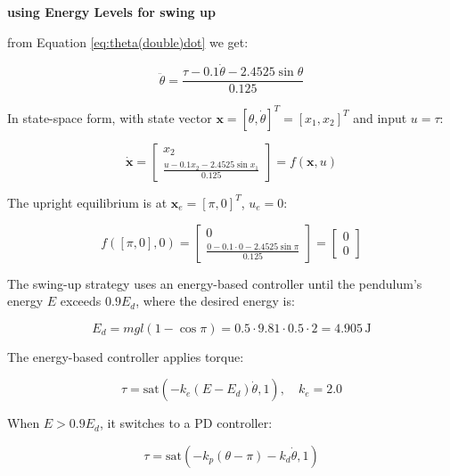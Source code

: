 \documentclass[12pt,a4paper]{article}
\begin{document}
\textbf{using Energy Levels for swing up}


from Equation \eqref{eq:theta(double)dot}
we get:

\begin{equation}\label{eq:theta(double)dot}
\ddot{\theta} = \frac{\tau - 0.1 \dot{\theta} - 2.4525 \sin \theta}{0.125}
\end{equation}

In state-space form, with state vector \( \mathbf{x} = [\theta, \dot{\theta}]^T = [x_1, x_2]^T \) and input \( u = \tau \):

\begin{equation}
\dot{\mathbf{x}} = \begin{bmatrix} x_2 \\ \frac{u - 0.1 x_2 - 2.4525 \sin x_1}{0.125} \end{bmatrix} = f(\mathbf{x}, u)
\end{equation}

The upright equilibrium is at \( \mathbf{x}_e = [\pi, 0]^T \), \( u_e = 0 \):

\begin{equation}
f([\pi, 0], 0) = \begin{bmatrix} 0 \\ \frac{0 - 0.1 \cdot 0 - 2.4525 \sin \pi}{0.125} \end{bmatrix} = \begin{bmatrix} 0 \\ 0 \end{bmatrix}
\end{equation}

The swing-up strategy uses an energy-based controller until the pendulum’s energy \( E \) exceeds \( 0.9 E_d \), where the desired energy is:

\begin{equation}
E_d = m g l (1 - \cos \pi) = 0.5 \cdot 9.81 \cdot 0.5 \cdot 2 = 4.905 \, \text{J}
\end{equation}

The energy-based controller applies torque:

\begin{equation}
\tau = \text{sat}(-k_e (E - E_d) \dot{\theta}, 1), \quad k_e = 2.0
\end{equation}

When \( E > 0.9 E_d \), it switches to a PD controller:

\begin{equation}
\tau = \text{sat}(-k_p (\theta - \pi) - k_d \dot{\theta}, 1)
\end{equation}
\end{document}
